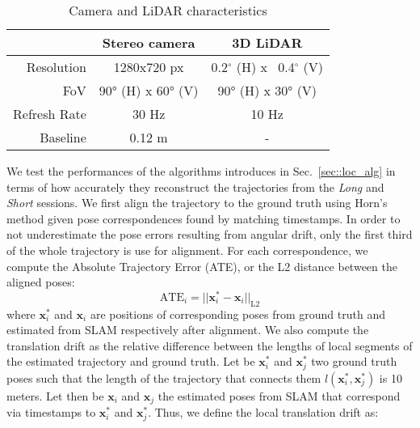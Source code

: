 \documentclass[conference]{IEEEtran}  %
\begin{document}
\begin{table}[ht]
    \centering
    \caption{Camera and LiDAR characteristics}
    \begin{tabular}{|r|c|c|}
    \hline
                    & \textbf{Stereo camera} & \textbf{3D LiDAR} \\ \hline\hline
         Resolution & 1280x720 px & 0.2$^\circ$ (H) x ~0.4$^\circ$ (V)\\
         FoV & 90° (H) x 60° (V) & 90° (H) x 30° (V) \\
         Refresh Rate & 30 Hz & 10 Hz \\
         Baseline & 0.12 m& - \\
         \hline
    \end{tabular}
    \label{tab:sensors_spec}
\end{table}
We test the performances of the algorithms introduces in Sec.~\ref{sec::loc_alg} in terms of how accurately they reconstruct the trajectories from the \textit{Long} and \textit{Short} sessions. We first align the trajectory to the ground truth using Horn's method \cite{Horn} given pose correspondences found by matching timestamps. In order to not underestimate the pose errors resulting from angular drift, only the first third of the whole trajectory is use for alignment. For each correspondence, we compute the Absolute Trajectory Error (ATE), or the L2 distance between the aligned poses:
\begin{equation}
    \text{ATE}_i = ||\mathbf{x}_i^* - \mathbf{x}_i||_\text{L2}
\end{equation}
where $\mathbf{x}_i^*$ and $\mathbf{x}_i$ are positions of corresponding poses from ground truth and estimated from SLAM respectively after alignment. We also compute the translation drift as the relative difference between the lengths of local segments of the estimated trajectory and ground truth. Let be $\mathbf{x}_i^*$ and $\mathbf{x}_j^*$ two ground truth poses such that the length of the trajectory that connects them $l(\mathbf{x}_i^*, \mathbf{x}_j^*)$ is 10 meters. Let then be $\mathbf{x}_i$ and $\mathbf{x}_j$ the estimated poses from SLAM that correspond via timestamps to $\mathbf{x}_i^*$ and $\mathbf{x}_j^*$. Thus, we define the local translation drift as:
\end{document}
